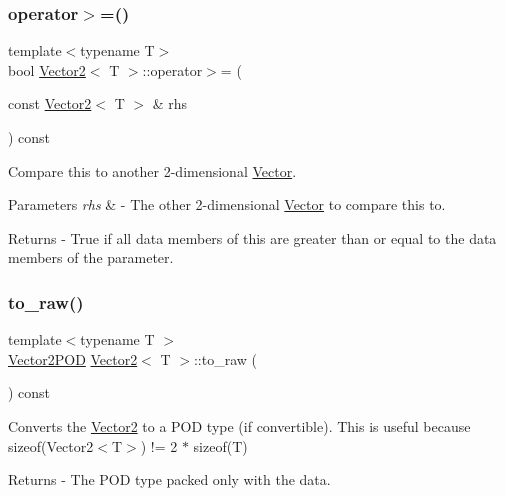 \subsubsection{\texorpdfstring{operator$>$=()}{operator>=()}}
{\footnotesize\ttfamily template$<$typename T$>$ \\
bool \mbox{\hyperlink{class_vector2}{Vector2}}$<$ T $>$\+::operator$>$= (\begin{DoxyParamCaption}\item[{const \mbox{\hyperlink{class_vector2}{Vector2}}$<$ T $>$ \&}]{rhs }\end{DoxyParamCaption}) const}

Compare this to another 2-\/dimensional \mbox{\hyperlink{class_vector}{Vector}}. 
\begin{DoxyParams}{Parameters}
{\em rhs} & -\/ The other 2-\/dimensional \mbox{\hyperlink{class_vector}{Vector}} to compare this to. \\
\hline
\end{DoxyParams}
\begin{DoxyReturn}{Returns}
-\/ True if all data members of this are greater than or equal to the data members of the parameter. 
\end{DoxyReturn}
\mbox{\label{class_vector2_ab4c2e1a3fe9216e506e3ab60c02348b2}} 
\subsubsection{\texorpdfstring{to\+\_\+raw()}{to\_raw()}}
{\footnotesize\ttfamily template$<$typename T $>$ \\
\mbox{\hyperlink{struct_vector2_p_o_d}{Vector2\+P\+OD}} \mbox{\hyperlink{class_vector2}{Vector2}}$<$ T $>$\+::to\+\_\+raw (\begin{DoxyParamCaption}{ }\end{DoxyParamCaption}) const}

Converts the \mbox{\hyperlink{class_vector2}{Vector2}} to a P\+OD type (if convertible). This is useful because sizeof(\+Vector2$<$\+T$>$) != 2 $\ast$ sizeof(\+T) \begin{DoxyReturn}{Returns}
-\/ The P\+OD type packed only with the data. 
\end{DoxyReturn}
\mbox{\label{class_vector2_a318be8911fa2fbb1887f95196d26c6e8}} 
